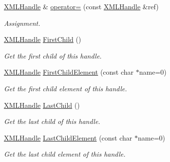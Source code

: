 \begin{DoxyCompactItemize}
\mbox{\hyperlink{classtinyxml2_1_1XMLHandle}{X\+M\+L\+Handle}} \& \mbox{\hyperlink{classtinyxml2_1_1XMLHandle_a75b908322bb4b83be3281b6845252b20}{operator=}} (const \mbox{\hyperlink{classtinyxml2_1_1XMLHandle}{X\+M\+L\+Handle}} \&ref)
\begin{DoxyCompactList}\small\item\em Assignment. \end{DoxyCompactList}\item 
\mbox{\label{classtinyxml2_1_1XMLHandle_a536447dc7f54c0cd11e031dad94795ae}} 
\mbox{\hyperlink{classtinyxml2_1_1XMLHandle}{X\+M\+L\+Handle}} \mbox{\hyperlink{classtinyxml2_1_1XMLHandle_a536447dc7f54c0cd11e031dad94795ae}{First\+Child}} ()
\begin{DoxyCompactList}\small\item\em Get the first child of this handle. \end{DoxyCompactList}\item 
\mbox{\label{classtinyxml2_1_1XMLHandle_a74b04dd0f15e0bf01860e282b840b6a3}} 
\mbox{\hyperlink{classtinyxml2_1_1XMLHandle}{X\+M\+L\+Handle}} \mbox{\hyperlink{classtinyxml2_1_1XMLHandle_a74b04dd0f15e0bf01860e282b840b6a3}{First\+Child\+Element}} (const char $\ast$name=0)
\begin{DoxyCompactList}\small\item\em Get the first child element of this handle. \end{DoxyCompactList}\item 
\mbox{\label{classtinyxml2_1_1XMLHandle_a9d09f04435f0f2f7d0816b0198d0517b}} 
\mbox{\hyperlink{classtinyxml2_1_1XMLHandle}{X\+M\+L\+Handle}} \mbox{\hyperlink{classtinyxml2_1_1XMLHandle_a9d09f04435f0f2f7d0816b0198d0517b}{Last\+Child}} ()
\begin{DoxyCompactList}\small\item\em Get the last child of this handle. \end{DoxyCompactList}\item 
\mbox{\label{classtinyxml2_1_1XMLHandle_a42cccd0ce8b1ce704f431025e9f19e0c}} 
\mbox{\hyperlink{classtinyxml2_1_1XMLHandle}{X\+M\+L\+Handle}} \mbox{\hyperlink{classtinyxml2_1_1XMLHandle_a42cccd0ce8b1ce704f431025e9f19e0c}{Last\+Child\+Element}} (const char $\ast$name=0)
\begin{DoxyCompactList}\small\item\em Get the last child element of this handle. \end{DoxyCompactList}\item 

\end{DoxyCompactItemize}

